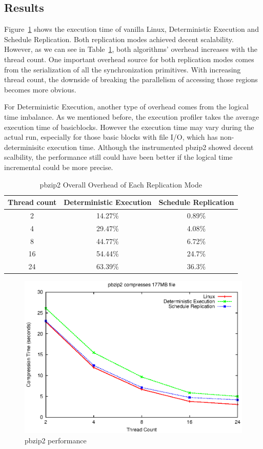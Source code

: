\subsection{Results}

Figure~\ref{f:pbzip_b10_performance} shows the execution time of vanilla Linux, Deterministic Execution and Schedule Replication. Both replication modes achieved decent scalability. However, as we can see in Table~\ref{t:pbzip2_overall}, both algorithms' overhead increases with the thread count. One important overhead source for both replication modes comes from the serialization of all the synchronization primitives. With increasing thread count, the downside of breaking the parallelism of accessing those regions becomes more obvious.

For Deterministic Execution, another type of overhead comes from the logical time imbalance. As we mentioned before, the execution profiler takes the average execution time of basicblocks. However the execution time may vary during the actual run, especially for those basic blocks with file I/O, which has non-determinisitc execution time. Although the instrumented pbzip2 showed decent scalbility, the performance still could have been better if the logical time incremental could be more precise.


\begin{table}
\caption{pbzip2 Overall Overhead of Each Replication Mode}
\begin{center}
 \begin{tabular}{c | c | c}
Thread count & Deterministic Execution & Schedule Replication \\ \hline
 2 & 14.27\% & 0.89\% \\ \hline
 4 & 29.47\% & 4.08\% \\ \hline
 8 & 44.77\% & 6.72\% \\ \hline
 16 & 54.44\% & 24.7\% \\ \hline
 24 & 63.39\% & 36.3\% \\ \hline 
 \end{tabular}
\end{center}
\label{t:pbzip2_overall}
\end{table}

\begin{figure}
\centering
\includegraphics[width=0.8\columnwidth]{figures/pbzip2_b10}
\caption{pbzip2 performance}
\label{f:pbzip_b10_performance}
\end{figure}

